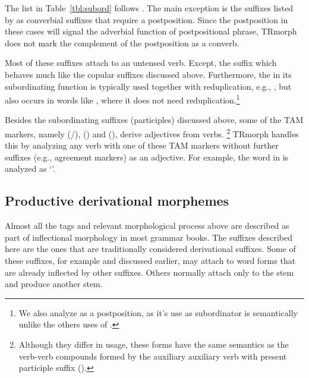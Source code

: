 \documentclass[twocolumn]{article}
\begin{document}
The list in Table~\ref{tbl:subord} follows \cite{goksel2005}. The main
exception is the suffixes listed by \cite{goksel2005} as converbial
suffixes that require a postposition. Since the postposition in these
cases will signal the adverbial function of postpositional phrase,
TRmorph does not mark the complement of the postposition as a converb.

%
%

Most of these suffixes attach to an untensed verb. Except, the suffix
 which behaves much like the copular suffixes discussed
above. Furthermore, the  in its subordinating function
is typically used together with reduplication, e.g., , but also occurs in words like
, where it does not need reduplication.\footnote{We
also analyze  as a postposition, as it's use as
subordinator is semantically unlike the others uses of .}

Besides the subordinating suffixes (participles) discussed above, 
some of the TAM markers, 
namely  (/),  () and  (),
derive adjectives from verbs.%
\footnote{Although they differ in usage, 
these forms have the same semantics as 
the verb-verb compounds formed by the auxiliary auxiliary verb  with present participle suffix ().}
TRmorph handles this by analyzing any verb with one of these TAM markers without further suffixes 
(e.g., agreement markers) as an adjective. 
For example, the word 
 in 
is analyzed as
`'.

\subsection{Productive derivational morphemes}

Almost all the tags and relevant morphological process above are
described as part of inflectional morphology in most grammar books.
The suffixes described here are the ones that are traditionally
considered derivational suffixes. Some of these suffixes, for example
 and  discussed earlier, may attach to word forms
that are already inflected by other suffixes. Others normally attach
only to the stem and produce another stem.
\end{document}
